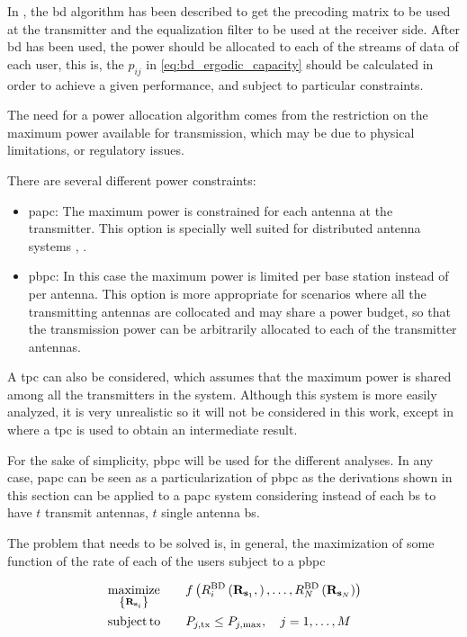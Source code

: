 In , the \gls{bd} algorithm has been described to get the precoding
matrix to be used at the transmitter and the equalization filter to be used at
the receiver side. After \gls{bd} has been used, the power should be allocated
to each of the streams of data of each user, this is, the $p_{ij}$ in
\eqref{eq:bd_ergodic_capacity} should be calculated in order to achieve a given
performance, and subject to particular constraints.

The need for a power allocation algorithm comes from the restriction on the
maximum power available for transmission, which may be due to physical
limitations, or regulatory issues.

There are several different power constraints:

\begin{itemize}
    \item \gls{papc}: The maximum power is constrained for each antenna at the
        transmitter. This option is specially well suited for distributed
        antenna systems \cite{choi07}, \cite{lee12}.
    \item \gls{pbpc}: In this case the maximum power is limited per base station
        instead of per antenna. This option is more appropriate for scenarios
        where all the transmitting antennas are collocated and may share a power
        budget, so that the transmission power can be arbitrarily allocated to
        each of the transmitter antennas.
\end{itemize}

A \gls{tpc} can also be considered, which assumes that the maximum power is
shared among all the transmitters in the system. Although this system is more
easily analyzed, it is very unrealistic so it will not be considered in this
work, except in  where a \gls{tpc} is used to obtain an
intermediate result.

For the sake of simplicity, \gls{pbpc} will be used for the different analyses. In any case, \gls{papc} can be seen as a particularization of \gls{pbpc} as the
derivations shown in this section can be applied to a \gls{papc} system
considering instead of each \gls{bs} to have $t$ transmit antennas, $t$ single
antenna \gls{bs}.

The problem that needs to be solved is, in general, the maximization of some
function of the rate of each of the users subject to a \gls{pbpc}

\begin{equation} \label{eq:generic_optim_problem}
\begin{aligned}
	&\operatorname*{maximize}\limits_{\left\{\mathbf{R}_{\mathbf{s}_i}\right\}} &&\quad f\left(R_i^{\text{BD}}
    \left(\mathbf{R}_{\mathbf{s}_1},\right), \ldots, R_N^{\text{BD}}\left(\mathbf{R}_{\mathbf{s}_N}\right)
    \right) \\
	&\operatorname*{subject\,to} &&\quad P_{j, \text{tx}} \leq P_{j, \max},\quad j = 1, \ldots, M
\end{aligned}
\end{equation}

